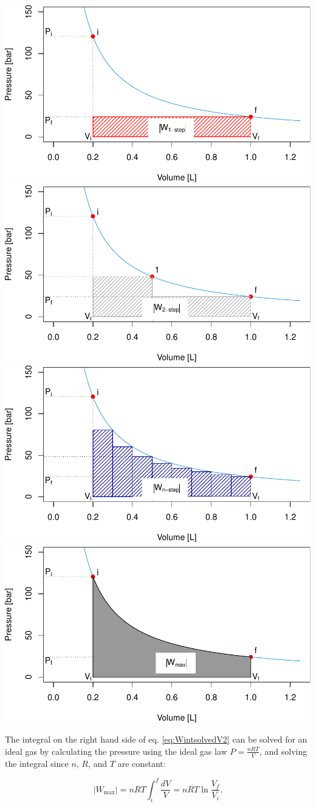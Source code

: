 \documentclass[
  9pt,
]{extbook}
\theoremstyle{definition}
\theoremstyle{definition}
\theoremstyle{definition}
\theoremstyle{definition}
\theoremstyle{remark}
\begin{document}
\includegraphics[width=0.5\linewidth,height=1\textheight]{pchem1_files/figure-latex/figures-side-1} \includegraphics[width=0.5\linewidth,height=1\textheight]{pchem1_files/figure-latex/figures-side-2} \includegraphics[width=0.5\linewidth,height=1\textheight]{pchem1_files/figure-latex/figures-side-3} \includegraphics[width=0.5\linewidth,height=1\textheight]{pchem1_files/figure-latex/figures-side-4}

The integral on the right hand side of eq. \eqref{eq:WintsolvedV2} can be solved for an ideal gas by calculating the pressure using the ideal gas law \(P=\frac{nRT}{V}\), and solving the integral since \(n\), \(R\), and \(T\) are constant:

\begin{equation}
  \left| W_{\text{max}} \right| = nRT \int_{i}^{f} \frac{dV}{V} = nRT \ln \frac{V_f}{V_i}.
  \label{eq:WmaxV}
\end{equation}
\end{document}
